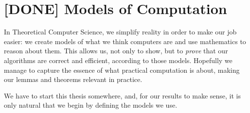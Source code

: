 \chapter{[DONE] Models of Computation}%
\label{chapter:models-of-computation}

In Theoretical Computer Science, we simplify reality in order to make our job
easier: we create models of what we think computers are and use mathematics to
reason about them.
%
This allows us, not only to show, but to \emph{prove} that our algorithms are
correct and efficient, according to those models.
%
Hopefully we manage to capture the essence of what practical computation is
about, making our lemmas and theorems relevant in practice.

We have to start this thesis somewhere, and,
for our results to make sense,
it is only natural that we begin by defining the models we
use.



